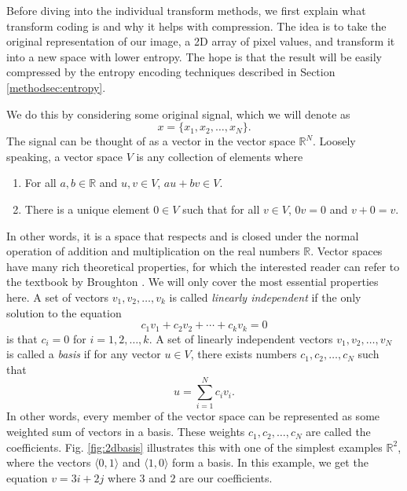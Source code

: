 
Before diving into the individual transform methods, we first explain what transform coding is and why it helps with compression. The idea is to take the original representation of our image, a 2D array of pixel values, and transform it into a new space with lower entropy. The hope is that the result will be easily compressed by the entropy encoding techniques described in Section \ref{methodsec:entropy}.

We do this by considering some original signal, which we will denote as 
\begin{equation}
        x=\{x_1,x_2,\dots,x_N\}\label{eq:sig}.
\end{equation}
The signal can be thought of as a vector in the vector space $\mathbb{R}^N$. Loosely speaking, a vector space $V$ is any collection of elements where
\begin{enumerate}
    \item For all $a,b\in\mathbb{R}$ and $u,v\in V$, $au+bv\in V$.
    \item There is a unique element $0\in V$ such that for all $v\in V$, $0v=0$ and $v+0=v$.
\end{enumerate}
In other words, it is a space that respects and is closed under the normal operation of addition and multiplication on the real numbers $\mathbb{R}$. Vector spaces have many rich theoretical properties, for which the interested reader can refer to the textbook by Broughton \cite{broughton2009discrete}. We will only cover the most essential properties here. A set of vectors $v_1,v_2,\dots,v_k$ is called \textit{linearly independent} if the only solution to the equation
\begin{equation}
    c_1v_1+c_2v_2+\dotsb+c_kv_k=0\label{eq:lin_ind}
\end{equation}
is that $c_i=0$ for $i=1,2,\dots,k$. A set of linearly independent vectors $v_1,v_2,\dots,v_N$ is called a \textit{basis} if for any vector $u\in V$, there exists numbers $c_1,c_2,\dots,c_N$ such that
\begin{equation}
    u=\sum_{i=1}^{N}c_iv_i.
\end{equation}
In other words, every member of the vector space can be represented as some weighted sum of vectors in a basis. These weights $c_1,c_2,\dots,c_N$ are called the coefficients. Fig. \ref{fig:2dbasis} illustrates this with one of the simplest examples $\mathbb{R}^2$, where the vectors $\langle0,1\rangle$ and $\langle1,0\rangle$ form a basis. In this example, we get the equation $v=3i+2j$ where $3$ and $2$ are our coefficients.
